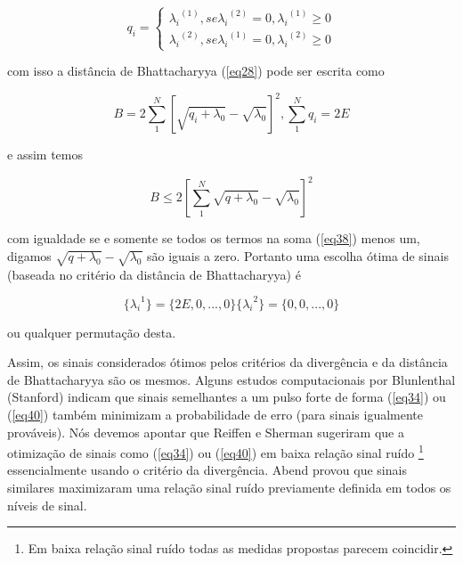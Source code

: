 \documentclass{sbrt2017port}
\begin{document}
\begin{equation}
	q_i = \left\{\begin{matrix} {\lambda_i}^{(1)}, se {\lambda_i}^{(2)}=0, {\lambda_i}^{(1)} \geq 0 \\{\lambda_i}^{(2)}, se {\lambda_i}^{(1)}=0, {\lambda_i}^{(2)} \geq 0	\end{matrix}\right.
	\label{eq37}
\end{equation}

com isso a distância de Bhattacharyya (\ref{eq28}) pode ser escrita como

\begin{equation}
	B = 2\sum_{1}^{N} {[ \sqrt{q_i + \lambda_0} - \sqrt{\lambda_0} ]}^2, \sum_{1}^{N}q_i = 2E
	\label{eq38}
\end{equation}

e assim temos

\begin{equation}
	B \leq 2 [\sum_{1}^{N} \sqrt{q+\lambda_0} - \sqrt{\lambda_0} ]^2
	\label{eq39}
\end{equation}

com igualdade se e somente se todos os termos na soma (\ref{eq38}) menos um, digamos $\sqrt{q+\lambda_0} - \sqrt{\lambda_0}$ são iguais a zero. Portanto uma escolha ótima de sinais (baseada no critério da distância de Bhattacharyya) é

\begin{equation}
	\{{\lambda_i}^{1}\} = \{2E, 0,...,0 \} \{{\lambda_i}^{2}\} = \{0, 0,...,0 \}
	\label{eq40}
\end{equation}
	
ou qualquer permutação desta.

Assim, os sinais considerados ótimos pelos critérios da divergência e da distância de Bhattacharyya são os mesmos. Alguns estudos computacionais por Blunlenthal (Stanford) indicam que sinais semelhantes a um pulso forte de forma (\ref{eq34}) ou (\ref{eq40}) também minimizam a probabilidade de erro (para sinais igualmente prováveis). Nós devemos apontar que Reiffen e Sherman \cite{r20} sugeriram que a otimização de sinais como (\ref{eq34}) ou (\ref{eq40}) em baixa relação sinal ruído \footnote[10]{Em baixa relação sinal ruído todas as medidas propostas parecem coincidir.} essencialmente usando o critério da divergência. Abend \cite{r22} provou que sinais similares maximizaram uma relação sinal ruído previamente definida em todos os níveis de sinal.
\end{document}
